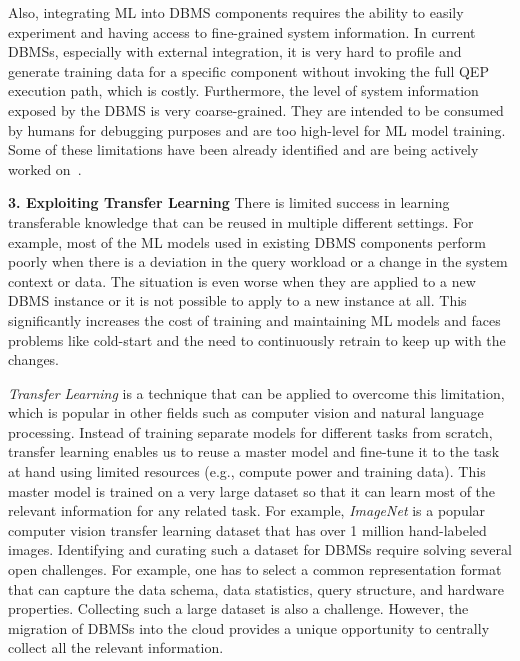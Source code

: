 Also, integrating ML into DBMS components requires the ability to easily experiment and having access to fine-grained system information.
In current DBMSs, especially with external integration, it is very hard to profile and generate training data for a specific component without invoking the full QEP execution path, which is costly.
Furthermore, the level of system information exposed by the DBMS is very coarse-grained.
They are intended to be consumed by humans for debugging purposes and are too high-level for ML model training.
Some of these limitations have been already identified and are being actively worked on~\cite{noisepage}.

\vspace{2mm}
\noindent \textbf{3. Exploiting Transfer Learning} There is limited success in learning transferable knowledge that can be reused in multiple different settings.
For example, most of the ML models used in existing DBMS components perform poorly when there is a deviation in the query workload or a change in the system context or data.
The situation is even worse when they are applied to a new DBMS instance or it is not possible to apply to a new instance at all.
This significantly increases the cost of training and maintaining ML models and faces problems like cold-start and the need to continuously retrain to keep up with the changes.

\textit{Transfer Learning} is a technique that can be applied to overcome this limitation, which is popular in other fields such as computer vision and natural language processing.
Instead of training separate models for different tasks from scratch, transfer learning enables us to reuse a master model and fine-tune it to the task at hand using limited resources (e.g., compute power and training data).
This master model is trained on a very large dataset so that it can learn most of the relevant information for any related task.
For example, \textit{ImageNet} is a popular computer vision transfer learning dataset that has over 1 million hand-labeled images.
Identifying and curating such a dataset for DBMSs require solving several open challenges.
For example, one has to select a common representation format that can capture the data schema, data statistics, query structure, and hardware properties.
Collecting such a large dataset is also a challenge.
However, the migration of DBMSs into the cloud provides a unique opportunity to centrally collect all the relevant information.